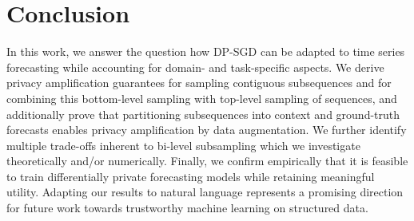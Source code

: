 \section{Conclusion}
In this  work, we answer the question how  
 DP-SGD can be adapted to time series forecasting while accounting for domain- and task-specific aspects.
We derive privacy amplification guarantees for sampling contiguous subsequences and for combining this bottom-level sampling  with top-level sampling of sequences, and additionally prove that partitioning subsequences into context and ground-truth forecasts enables privacy amplification by data augmentation.
We further identify multiple trade-offs inherent to bi-level subsampling 
which we investigate theoretically and/or numerically.
Finally, we confirm empirically that it is feasible to train differentially private forecasting models while retaining meaningful utility.
Adapting our results to natural language represents a promising direction for future work towards trustworthy machine learning on structured data.